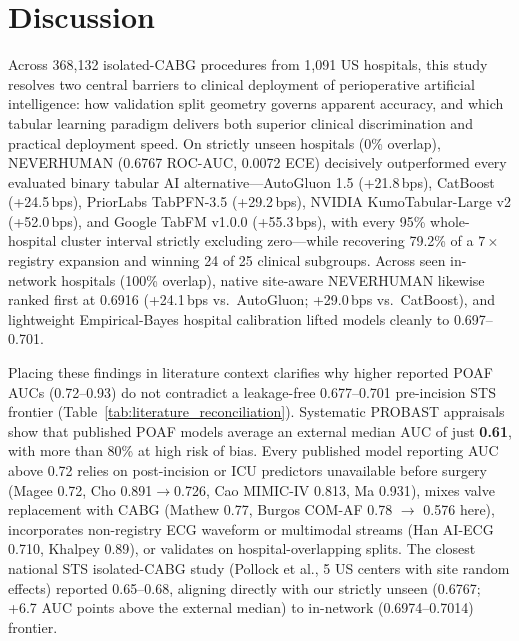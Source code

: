 \section{Discussion}

Across 368,132 isolated-CABG procedures from 1,091 US hospitals, this study resolves two central barriers to clinical deployment of perioperative artificial intelligence: how validation split geometry governs apparent accuracy, and which tabular learning paradigm delivers both superior clinical discrimination and practical deployment speed. On strictly unseen hospitals (0\% overlap), NEVERHUMAN (0.6767 ROC-AUC, 0.0072 ECE) decisively outperformed every evaluated binary tabular AI alternative---AutoGluon 1.5 (+21.8\,bps), CatBoost (+24.5\,bps), PriorLabs TabPFN-3.5 (+29.2\,bps), NVIDIA KumoTabular-Large v2 (+52.0\,bps), and Google TabFM v1.0.0 (+55.3\,bps), with every 95\% whole-hospital cluster interval strictly excluding zero---while recovering 79.2\% of a $7\times$ registry expansion and winning 24 of 25 clinical subgroups. Across seen in-network hospitals (100\% overlap), native site-aware NEVERHUMAN likewise ranked first at 0.6916 (+24.1\,bps vs.\ AutoGluon; +29.0\,bps vs.\ CatBoost), and lightweight Empirical-Bayes hospital calibration lifted models cleanly to 0.697--0.701.

Placing these findings in literature context clarifies why higher reported POAF AUCs (0.72--0.93) do not contradict a leakage-free 0.677--0.701 pre-incision STS frontier (Table~\ref{tab:literature_reconciliation}). Systematic PROBAST appraisals show that published POAF models average an external median AUC of just \textbf{0.61}, with more than 80\% at high risk of bias.\cite{fields2025poaf,lopeztuesta2026poaf} Every published model reporting AUC above 0.72 relies on post-incision or ICU predictors unavailable before surgery (Magee 0.72,\cite{magee2007atrial} Cho 0.891$\to$0.726,\cite{cho2026poaf} Cao MIMIC-IV 0.813,\cite{cao2025mimic4} Ma 0.931\cite{ma2025noaf}), mixes valve replacement with CABG (Mathew 0.77,\cite{mathew2004multicenter} Burgos COM-AF 0.78 $\to$ 0.576 here\cite{burgos2021comaf}), incorporates non-registry ECG waveform or multimodal streams (Han AI-ECG 0.710,\cite{han2025aiecg} Khalpey 0.89\cite{khalpey2026digital}), or validates on hospital-overlapping splits. The closest national STS isolated-CABG study (Pollock et al., 5 US centers with site random effects) reported 0.65--0.68,\cite{pollock2018chargeaf} aligning directly with our strictly unseen (0.6767; +6.7 AUC points above the external median) to in-network (0.6974--0.7014) frontier.

